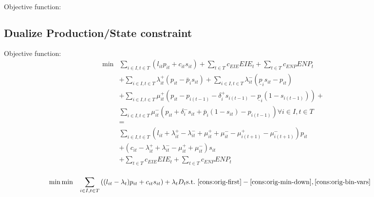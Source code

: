 \documentclass[12pt, a4paper]{article}
\begin{document}
Objective function:


\subsection*{Dualize Production/State constraint}

Objective function:
\begin{align*}
  \min &\sum_{i\in I, t\in T} \left ( l_{it} p_{it} + c_{it} s_{it} \right ) + \sum_{t\in T} c_{EIE} EIE_t + \sum_{t\in T} c_{ENP} ENP_t  \\
       & + \sum_{i\in I, t\in T} \lambda^+_{it} (p_{it} - \bar{p}_i s_{it}) + \sum_{i\in I, t\in T} \lambda^-_{it} (\underline{p}_{i} s_{it} - p_{it})   \\
       & + \sum_{i\in I, t\in T} \mu^+_{it} (p_{it} - p_{i(t-1)} - \delta^+_i s_{i(t-1)}  - \underline{p}_i (1 - s_{i(t-1)})) + \\
  &\sum_{i\in I, t\in T} \mu^-_{it} (p_{it} + \delta^-_{i} s_{it}  + \bar{p}_i (1 - s_{it}) - p_{i(t-1)}) \forall i\in I, t \in T\\
       &=\\
       & \sum_{i\in I, t\in T} (l_{it} + \lambda^+_{it} - \lambda^-_{it} + \mu^+_{it} + \mu^-_{it} - \mu^+_{i(t+1)} -\mu^-_{i(t+1)} )  p_{it}\\
       & + (c_{it} - \lambda^+_{it} + \lambda^-_{it} - \mu^+_{it} + \mu^-_{it})  s_{it}  \\ & + \sum_{t\in T} c_{EIE} EIE_t + \sum_{t\in T} c_{ENP} ENP_t  \\
\end{align*}

  \begin{align}
  \min &    \min &\sum_{i\in I, t\in T} \left ( (l_{it} -\lambda_t) p_{it} + c_{it} s_{it} \right ) + \lambda_t D_t
  \text{s.t.~} & \eqref{cons:orig-first}-\eqref{cons:orig-min-down}, \eqref{cons:orig-bin-vars} 
\end{align}
\end{document}
